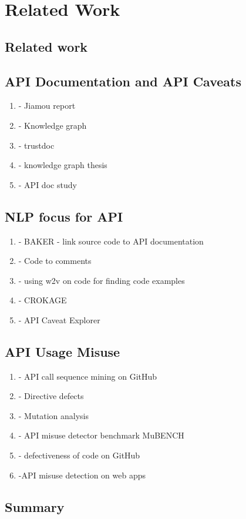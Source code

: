 \chapter{Related Work}
\label{cha:background}
%

\section{Related work}
\label{sec:relatedwork}

\section{API Documentation and API Caveats}
\begin{enumerate}
	\item \cite{jiamou} - Jiamou report
	\item \cite{caveat-knowledge-graph} - Knowledge graph
	\item \cite{xiaoxue} - trustdoc
	\item \cite{construct-knowledge-graph} - knowledge graph thesis
	\item \cite{uddin2015api} - API doc study
\end{enumerate}

\section{NLP focus for API}
\begin{enumerate}
\item \cite{live-api-doc} - BAKER - link source code to API documentation
\item \cite{zheng2017code} - Code to comments
\item \cite{van2017combining} - using w2v on code for finding code examples
\item \cite{silva2019recommending} - CROKAGE
\item \cite{li2018api} - API Caveat Explorer
\end{enumerate}

\section{API Usage Misuse}
\begin{enumerate}
	\item \cite{code-examples} - API call sequence mining on GitHub
	\item \cite{zhou-directive} - Directive defects
	\item \cite{mutation-analysis} - Mutation analysis
	\item \cite{amann2016mubench} - API misuse detector benchmark MuBENCH
	\item \cite{kapur2018estimating} - defectiveness of code on GitHub
	\item \cite{bae2014safewapi} -API misuse detection on web apps
\end{enumerate}

\section{Summary}



